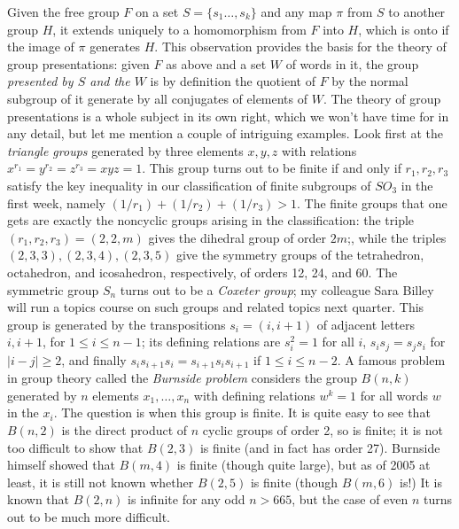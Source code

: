 \documentclass[10pt]{article}
\begin{document}
Given the free group $F$ on a set $S=\{s_1\ldots,s_k\}$ and any map
$\pi$ from $S$ to another group $H$, it extends uniquely to a
homomorphism from $F$ into $H$, which is onto if the image of $\pi$
generates $H$. This observation provides the basis for the theory of
group presentations: given $F$ as above and a set $W$ of words in it,
the group {\sl presented by $S$ and the $W$} is by definition the
quotient of $F$ by the normal subgroup of it generate by all conjugates
of elements of $W$. The theory of group presentations is a whole subject
in its own right, which we won't have time for in any detail, but let me
mention a couple of intriguing examples. Look first at the {\sl triangle
  groups} generated by three elements $x,y,z$ with relations
$x^{r_1}=y^{r_2}=z^{r_3}=xyz=1$. This group turns out to be finite if
and only if $r_1,r_2,r_3$ satisfy the key inequality in our
classification of finite subgroups of $SO_3$ in the first week, namely
$(1/r_1) + (1/r_2) + (1/r_3) > 1$. The finite groups that one gets are
exactly the noncyclic groups arising in the classification: the triple
$(r_1,r_2,r_3) = (2,2,m)$ gives the dihedral group of order $2m$;, while
the triples $(2,3,3),(2,3,4),(2,3,5)$ give the symmetry groups of the
tetrahedron, octahedron, and icosahedron, respectively, of orders 12,
24, and 60. The symmetric group $S_n$ turns out to be a {\sl Coxeter
  group}; my colleague Sara Billey will run a topics course on such
groups and related topics next quarter. This group is generated by the
transpositions $s_i = (i,i+1)$ of adjacent letters $i,i+1$, for $1\le
i\le n-1$; its defining relations are $s_i^2 = 1$ for all $i$, $s_i s_j
= s_j s_i$ for $ | i - j |\ge2$, and finally $s_i s_{i+1} s_i = s_{i+1}
s_i s_{i+1}$ if $1\le i\le n-2$. A famous problem in group theory called
the {\sl Burnside problem} considers the group $B(n,k)$ generated by $n$
elements $x_1,\ldots,x_n$ with defining relations $w^k = 1$ for all
words $w$ in the $x_i$. The question is when this group is finite. It is
quite easy to see that $B(n,2)$ is the direct product of $n$ cyclic
groups of order 2, so is finite; it is not too difficult to show that
$B(2,3)$ is finite (and in fact has order 27). Burnside himself showed
that $B(m,4)$ is finite (though quite large), but as of 2005 at least,
it is still not known whether $B(2,5)$ is finite (though $B(m,6)$ is!)
It is known that $B(2,n)$ is infinite for any odd $n>665$, but the case
of even $n$ turns out to be much more difficult.
\end{document}
